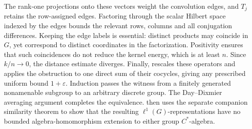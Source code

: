 The rank-one projections onto these vectors weight the convolution
edges, and \(T_j\) retains the row-assigned edges. Factoring through
the scalar Hilbert space indexed by the edges
bounds the relevant rows, columns and all conjugation differences.
Keeping the edge labels is essential: distinct products may coincide
in \(G\), yet correspond to distinct coordinates in the factorization.
Positivity ensures that such coincidences do not reduce the kernel
energy, which is at least \(n\). Since \(k/n\to0\), the distance
estimate diverges. Finally,  rescales these operators
and applies the
obstruction to one direct sum of their cocycles, giving any prescribed
uniform bound \(1+\varepsilon\). Induction passes the witness from a
finitely generated nonamenable subgroup to an arbitrary discrete group.
The Day--Dixmier averaging argument completes the equivalence.
 then uses the separate companion similarity
theorem to show that the resulting \(\ell^1(G)\)-representations have no
bounded algebra-homomorphism extension to either group \(C^*\)-algebra.
